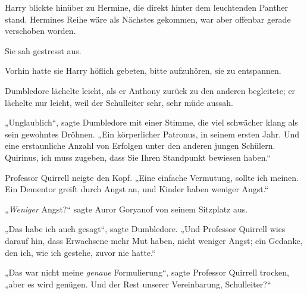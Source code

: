 Harry blickte hinüber zu Hermine, die direkt hinter dem leuchtenden Panther stand. Hermines Reihe wäre als Nächstes gekommen, war aber offenbar gerade verschoben worden.

Sie sah gestresst aus.

Vorhin hatte sie Harry höflich gebeten, bitte aufzuhören, sie zu entspannen.

Dumbledore lächelte leicht, als er Anthony zurück zu den anderen begleitete; er lächelte nur leicht, weil der Schulleiter sehr, sehr müde aussah.

„Unglaublich“, sagte Dumbledore mit einer Stimme, die viel schwächer klang als sein gewohntes Dröhnen. „Ein körperlicher Patronus, in seinem ersten Jahr. Und eine erstaunliche Anzahl von Erfolgen unter den anderen jungen Schülern. Quirinus, ich muss zugeben, dass Sie Ihren Standpunkt bewiesen haben.“

Professor Quirrell neigte den Kopf. „Eine einfache Vermutung, sollte ich meinen. Ein Dementor greift durch Angst an, und Kinder haben weniger Angst.“

„\emph{Weniger} Angst?“ sagte Auror Goryanof von seinem Sitzplatz aus.

„Das habe ich auch gesagt“, sagte Dumbledore. „Und Professor Quirrell wies darauf hin, dass Erwachsene mehr Mut haben, nicht weniger Angst; ein Gedanke, den ich, wie ich gestehe, zuvor nie hatte.“

„Das war nicht meine \emph{genaue} Formulierung“, sagte Professor Quirrell trocken, „aber es wird genügen. Und der Rest unserer Vereinbarung, Schulleiter?“

